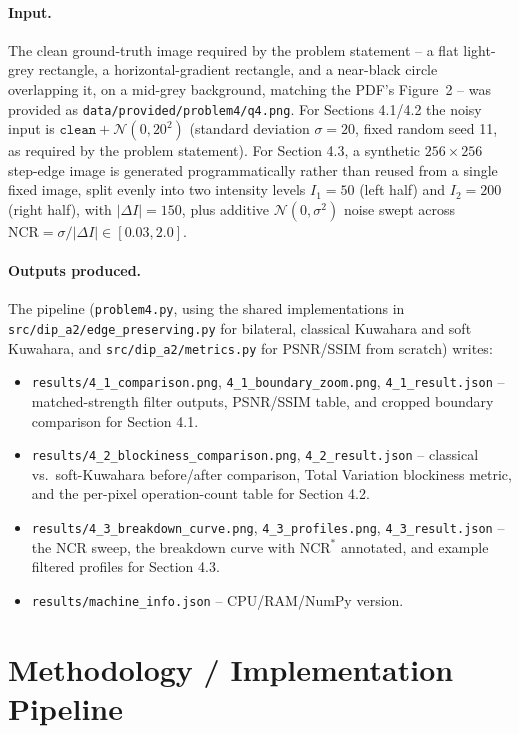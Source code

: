 \documentclass[11pt]{article}
\begin{document}
\paragraph{Input.} The clean ground-truth image required by the problem statement --
a flat light-grey rectangle, a horizontal-gradient rectangle, and a near-black circle
overlapping it, on a mid-grey background, matching the PDF's Figure~2 -- was provided
as \texttt{data/provided/problem4/q4.png}. For Sections 4.1/4.2 the noisy input is
$\texttt{clean} + \mathcal{N}(0,20^2)$ (standard deviation $\sigma=20$, fixed random
seed 11, as required by the problem statement). For Section 4.3, a synthetic
$256\times 256$ step-edge image is generated programmatically rather than reused from a
single fixed image, split evenly into two intensity levels $I_1=50$ (left half) and
$I_2=200$ (right half), with $|\Delta I|=150$, plus additive $\mathcal{N}(0,\sigma^2)$
noise swept across $\text{NCR}=\sigma/|\Delta I| \in [0.03, 2.0]$.

\paragraph{Outputs produced.} The pipeline (\texttt{problem4.py}, using the shared
implementations in \texttt{src/dip\_a2/edge\_preserving.py} for bilateral, classical
Kuwahara and soft Kuwahara, and \texttt{src/dip\_a2/metrics.py} for PSNR/SSIM from
scratch) writes:
\begin{itemize}[leftmargin=1.5em]
  \item \texttt{results/4\_1\_comparison.png}, \texttt{4\_1\_boundary\_zoom.png},
  \texttt{4\_1\_result.json} -- matched-strength filter outputs, PSNR/SSIM table, and
  cropped boundary comparison for Section 4.1.
  \item \texttt{results/4\_2\_blockiness\_comparison.png}, \texttt{4\_2\_result.json}
  -- classical vs.\ soft-Kuwahara before/after comparison, Total Variation blockiness
  metric, and the per-pixel operation-count table for Section 4.2.
  \item \texttt{results/4\_3\_breakdown\_curve.png}, \texttt{4\_3\_profiles.png},
  \texttt{4\_3\_result.json} -- the NCR sweep, the breakdown curve with
  $\text{NCR}^*$ annotated, and example filtered profiles for Section 4.3.
  \item \texttt{results/machine\_info.json} -- CPU/RAM/NumPy version.
\end{itemize}

\section{Methodology / Implementation Pipeline}
\end{document}
